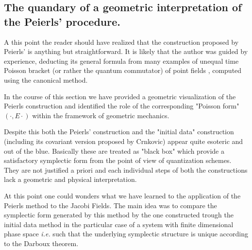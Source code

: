 \documentclass[Main]{subfiles}
\begin{document}
	\subsection{The quandary of a geometric interpretation of the Peierls' procedure.}
		A this point the reader should have realized that the construction proposed by Peierls' is anything but straightforward.
		It is likely that the author was guided by experience, deducting its general formula from many examples of unequal time Poisson bracket (or rather the quantum commutator) of point fields , computed using the canonical method.
		
		In the course of this section we have provided a geometric visualization of the Peierls construction and identified the role of the corresponding "Poisson form" $(\cdot, E \cdot )$  within the framework of geometric mechanics.

				
				
		Despite this both the Peierls' construction and the "initial data" construction (including its covariant version proposed by Crnkovic) appear quite esoteric and out of the blue.
		Basically these are treated as "black box" which provide a satisfactory symplectic form  from the point of view of quantization schemes.
		They are not justified a priori and each individual steps of both the constructions lack a geometric and physical interpretation.
		
		
		At this point one could wonders what we have learned to the application of the Peierls method to the Jacobi Fields.
		The main idea was to compare the symplectic form generated by this method by the one constructed trough the initial data method in the particular case of a system with finite dimensional phase space \textit{i.e.} such that the underlying symplectic structure is unique according to the Darboux theorem.
\end{document}
